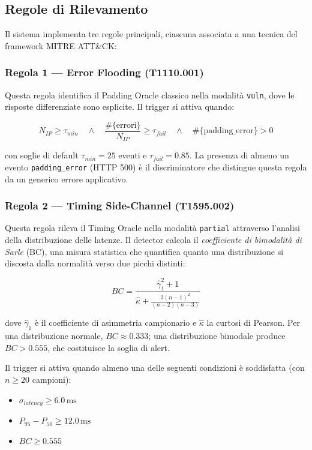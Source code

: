 \documentclass[12pt,a4paper]{article}
\begin{document}
\subsection{Regole di Rilevamento}

Il sistema implementa tre regole principali, ciascuna associata a una tecnica del framework
MITRE ATT\&CK:

\subsubsection{Regola 1 — Error Flooding (T1110.001)}

Questa regola identifica il Padding Oracle classico nella modalità \texttt{vuln}, dove
le risposte differenziate sono esplicite. Il trigger si attiva quando:

\[
  N_{IP} \geq \tau_{min} \quad \land \quad
  \frac{\#\{\text{errori}\}}{N_{IP}} \geq \tau_{fail} \quad \land \quad
  \#\{\text{padding\_error}\} > 0
\]

con soglie di default $\tau_{min} = 25$ eventi e $\tau_{fail} = 0.85$.
La presenza di almeno un evento \texttt{padding\_error} (HTTP 500) è il discriminatore
che distingue questa regola da un generico errore applicativo.

\subsubsection{Regola 2 — Timing Side-Channel (T1595.002)}

Questa regola rileva il Timing Oracle nella modalità \texttt{partial} attraverso
l'analisi della distribuzione delle latenze. Il detector calcola il
\emph{coefficiente di bimodalità di Sarle} (BC), una misura statistica che quantifica
quanto una distribuzione si discosta dalla normalità verso due picchi distinti:

\[
  BC = \frac{\hat{\gamma}_1^2 + 1}{\hat{\kappa} + \frac{3(n-1)^2}{(n-2)(n-3)}}
\]

dove $\hat{\gamma}_1$ è il coefficiente di asimmetria campionario e $\hat{\kappa}$
la curtosi di Pearson. Per una distribuzione normale, $BC \approx 0.333$; una
distribuzione bimodale produce $BC > 0.555$, che costituisce la soglia di alert.

Il trigger si attiva quando almeno una delle seguenti condizioni è soddisfatta
(con $n \geq 20$ campioni):
\begin{itemize}
  \item $\sigma_{latency} \geq 6.0\,\text{ms}$
  \item $P_{95} - P_{50} \geq 12.0\,\text{ms}$
  \item $BC \geq 0.555$
\end{itemize}
\end{document}
